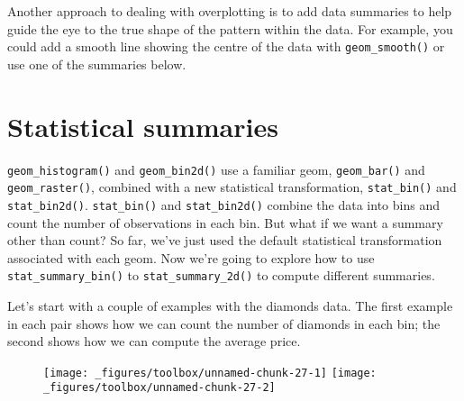 Another approach to dealing with overplotting is to add data summaries
to help guide the eye to the true shape of the pattern within the data.
For example, you could add a smooth line showing the centre of the data
with \texttt{geom\_smooth()} or use one of the summaries below.

\hypertarget{sec:summary}{%
\section{Statistical summaries}\label{sec:summary}}

 

\texttt{geom\_histogram()} and \texttt{geom\_bin2d()} use a familiar
geom, \texttt{geom\_bar()} and \texttt{geom\_raster()}, combined with a
new statistical transformation, \texttt{stat\_bin()} and
\texttt{stat\_bin2d()}. \texttt{stat\_bin()} and \texttt{stat\_bin2d()}
combine the data into bins and count the number of observations in each
bin. But what if we want a summary other than count? So far, we've just
used the default statistical transformation associated with each geom.
Now we're going to explore how to use \texttt{stat\_summary\_bin()} to
\texttt{stat\_summary\_2d()} to compute different summaries.

Let's start with a couple of examples with the diamonds data. The first
example in each pair shows how we can count the number of diamonds in
each bin; the second shows how we can compute the average price.

\begin{Shaded}
\begin{Highlighting}[]
\OperatorTok{+}\StringTok{ }
\StringTok{  }\NormalTok{()}

\OperatorTok{+}\StringTok{ }
\StringTok{  }\NormalTok{(} \NormalTok{, }
\end{Highlighting}
\end{Shaded}

\begin{figure}[H]
  \texttt{[image: \_figures/toolbox/unnamed-chunk-27-1]}%
  \texttt{[image: \_figures/toolbox/unnamed-chunk-27-2]}
\end{figure}

